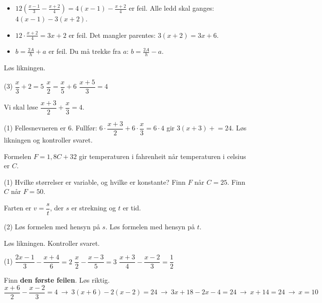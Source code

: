 \begin{vanligfeil}
\begin{itemize}[leftmargin=1.2em,itemsep=1pt,topsep=0pt]
  \item $12\left(\frac{x-1}{3} - \frac{x+2}{4}\right) = 4(x-1) - \frac{x+2}{4}$ er feil. Alle ledd skal ganges: $4(x-1) - 3(x+2)$.
  \item $12\cdot\frac{x+2}{4} = 3x + 2$ er feil. Det mangler parentes: $3(x+2) = 3x + 6$.
  \item $b = \frac{2A}{h} + a$ er feil. Du må trekke fra $a$: $b = \frac{2A}{h} - a$.
\end{itemize}
\end{vanligfeil}


Løs likningen.
\begin{tasks}(3)
  \task $\dfrac{x}{3} + 2 = 5$
  \task $\dfrac{x}{2} = \dfrac{x}{5} + 6$
  \task $\dfrac{x+5}{3} = 4$
\end{tasks}

Vi skal løse $\dfrac{x+3}{2} + \dfrac{x}{3} = 4$.
\begin{tasks}(1)
  \task Fellesnevneren er 6. Fullfør: $6\cdot\dfrac{x+3}{2} + 6\cdot\dfrac{x}{3} = 6\cdot 4$ gir $3(x+3) + $\skrivlinje[2cm]$ = 24$.
  \task Løs likningen og kontroller svaret.
\end{tasks}

Formelen $F = 1{,}8C + 32$ gir temperaturen i fahrenheit når temperaturen i celsius er $C$.
\begin{tasks}(1)
  \task Hvilke størrelser er variable, og hvilke er konstante?
  \task Finn $F$ når $C = 25$.
  \task Finn $C$ når $F = 50$.
\end{tasks}

Farten er $v = \dfrac{s}{t}$, der $s$ er strekning og $t$ er tid.
\begin{tasks}(2)
  \task Løs formelen med hensyn på $s$.
  \task Løs formelen med hensyn på $t$.
\end{tasks}


Løs likningen. Kontroller svaret.
\begin{tasks}(1)
  \task $\dfrac{2x-1}{3} - \dfrac{x+4}{6} = 2$
  \task $\dfrac{x}{2} - \dfrac{x-3}{5} = 3$
  \task $\dfrac{x+3}{4} - \dfrac{x-2}{3} = \dfrac{1}{2}$
\end{tasks}

Finn \textbf{den første feilen}. Løs riktig.
\[ \frac{x+6}{2} - \frac{x-2}{3} = 4 \ \to\ 3(x+6) - 2(x-2) = 24 \ \to\ 3x + 18 - 2x - 4 = 24 \ \to\ x + 14 = 24 \ \to\ x = 10 \]

